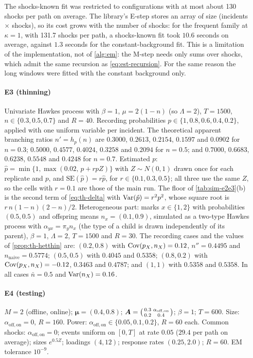 The shocks-known fit was restricted to configurations with at most about 130 shocks per path
on average. The library's E-step stores an array of size (incidents $\times$ shocks), so its
cost grows with the number of shocks: for the frequent family at $\kappa=1$, with 131.7
shocks per path, a shocks-known fit took $10.6$ seconds on average, against $1.3$ seconds
for the constant-background fit. This is a limitation of the implementation, not of
\cref{alg:em}: the M-step needs only sums over shocks, which admit the same recursion as
\eqref{eq:est-recursion}. For the same reason the long windows were fitted with the
constant background only.

\paragraph{E3 (thinning)} Univariate Hawkes process with $\beta=1$, $\mu=2(1-n)$ (so
$\Lambda=2$), $T=1500$, $n\in\{0.3,0.5,0.7\}$ and $R=40$. Recording probabilities
$p\in\{1,0.8,0.6,0.4,0.2\}$, applied with one uniform variable per incident. The
theoretical apparent branching ratios $n'=h_p(n)$ are $0.3000$, $0.2613$, $0.2154$,
$0.1597$ and $0.0902$ for $n=0.3$; $0.5000$, $0.4577$, $0.4024$, $0.3258$ and $0.2094$
for $n=0.5$; and $0.7000$, $0.6683$, $0.6238$, $0.5548$ and $0.4248$ for $n=0.7$.
Estimated $p$: $\hat p=\min\{1,\max(0.02,\,p+rpZ)\}$ with $Z\sim N(0,1)$ drawn once for
each replicate and $p$, and $\mathrm{SE}(\hat p)=r\hat p$, for $r\in\{0.1,0.3,0.5\}$; all
three use the same $Z$, so the cells with $r=0.1$ are those of the main run. The floor of
\cref{tab:sim-e2e3}(b) is the second term of \eqref{eq:th-delta} with
$\operatorname{Var}(\hat p)=r^2p^2$, whose square root is $r\,n(1-n)(2-n)/2$. Heterogeneous part: marks
$x\in\{1,2\}$ with probabilities $(0.5,0.5)$ and offspring means $n_x=(0.1,0.9)$,
simulated as a two-type Hawkes process with $\alpha_{yx}=\pi_yn_x$ (the type of a child is
drawn independently of its parent), $\beta=1$, $\Lambda=2$, $T=1500$ and $R=30$. The
recording cases and the values of \cref{prop:th-hetthin} are: $(0.2,0.8)$ with
$\operatorname{Cov}(p_X,n_X)=0.12$, $n''=0.4495$ and $n_{\mathrm{naive}}=0.5774$; $(0.5,0.5)$ with
$0.4045$ and $0.5358$; $(0.8,0.2)$ with $\operatorname{Cov}(p_X,n_X)=-0.12$, $0.3463$ and $0.4787$; and
$(1,1)$ with $0.5358$ and $0.5358$. In all cases $\bar n=0.5$ and $\operatorname{Var}(n_X)=0.16$.

\paragraph{E4 (testing)} $M=2$ (offline, online); $\bm\mu=(0.4,0.8)$;
$\bm{A}=\bigl(\begin{smallmatrix}0.3&\alpha_{\mathrm{off},\mathrm{on}}\\0.2&0.4\end{smallmatrix}\bigr)$;
$\beta=1$; $T=600$. Size: $\alpha_{\mathrm{off},\mathrm{on}}=0$, $R=160$. Power:
$\alpha_{\mathrm{off},\mathrm{on}}\in\{0.05,0.1,0.2\}$, $R=60$ each. Common shocks:
$\alpha_{\mathrm{off},\mathrm{on}}=0$; events uniform on $[0,T]$ at rate $0.05$ ($29.4$
per path on average); sizes $e^{0.5Z}$; loadings $(4,12)$; response rates $(0.25,2.0)$;
$R=60$. EM tolerance $10^{-9}$.

